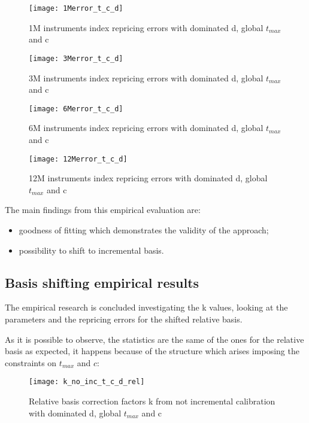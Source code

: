 \begin{figure}[H]
\centering
\texttt{[image: 1Merror\_t\_c\_d]}
\caption{1M instruments index repricing errors with dominated d, global $t_{max}$ and c}
\label{fig:1Merror_t_c_d}
\end{figure}

\begin{figure}[H]
\centering
\texttt{[image: 3Merror\_t\_c\_d]}
\caption{3M instruments index repricing errors with dominated d, global $t_{max}$ and c}
\label{fig:3Merror_t_c_d}
\end{figure}

\begin{figure}[H]
\centering
\texttt{[image: 6Merror\_t\_c\_d]}
\caption{6M instruments index repricing errors with dominated d, global $t_{max}$ and c}
\label{fig:6Merror_t_c_d}
\end{figure}

\begin{figure}[H]
\centering
\texttt{[image: 12Merror\_t\_c\_d]}
\caption{12M instruments index repricing errors with dominated d, global $t_{max}$ and c}
\label{fig:12Merror_t_c_d}
\end{figure}

The main findings from this empirical evaluation are:

\begin{itemize}
    \item goodness of fitting which demonstrates the validity of the approach;
    \item possibility to shift to incremental basis.
\end{itemize}

\subsection{Basis shifting empirical results}

The empirical research is concluded investigating the k values, looking at the parameters and the repricing errors for the shifted relative basis.

As it is possible to observe, the statistics are the same of the ones for the relative basis as expected, it happens because of the structure which arises imposing the constraints on $t_{max}$ and $c$:

\begin{figure}[H]
\centering
\texttt{[image: k\_no\_inc\_t\_c\_d\_rel]}
\caption{Relative basis correction factors k from not incremental calibration with dominated d, global $t_{max}$ and c}
\label{fig:k_no_inc_t_c_d_rel}
\end{figure}

